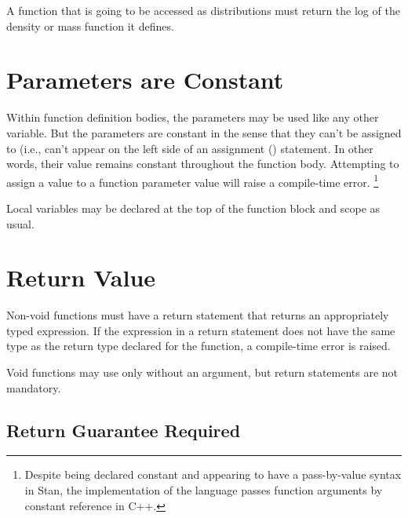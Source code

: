 A function that is going to be accessed as distributions must return
the log of the density or mass function it defines.


\section{Parameters are Constant}

Within function definition bodies, the parameters may be used like any
other variable.  But the parameters are constant in the sense that
they can't be assigned to (i.e., can't appear on the left side of an
assignment (\code{=}) statement.  In other words, their value remains
constant throughout the function body.  Attempting to assign a value
to a function parameter value will raise a compile-time error.%
%
\footnote{Despite being declared constant and appearing to have a
  pass-by-value syntax in Stan, the implementation of the language
  passes function arguments by constant reference in C++.}

Local variables may be declared at the top of the function block and
scope as usual.

\section{Return Value}\label{function-returns.section}

Non-void functions must have a return statement that returns an
appropriately typed expression.   If the expression in a return
statement does not have the same type as the return type declared for
the function, a compile-time error is raised.

Void functions may use  only without an argument, but
return statements are not mandatory.

\subsection{Return Guarantee Required}


